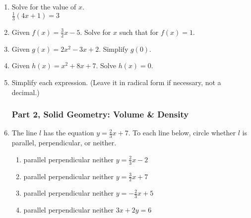 \documentclass[12pt, twoside]{article}
\begin{document}
\begin{enumerate}
\newpage
  \item   Solve for the value of $x$.\\[0.5cm]
  $\frac{1}{3}(4x+1)=3$ \vspace{3cm}

  \item Given $f(x)=\frac{3}{2} x-5$. Solve for $x$ such that for $f(x)=1$. \vspace{3.5cm}
  \item Given $g(x)=2x^2-3x+2$. Simplify $g(0)$. \vspace{4cm}
  \item Given $h(x)=x^2+8x+7$. Solve $h(x)=0$. \vspace{5cm}

  \item Simplify each expression. (Leave it in radical form if necessary, not a decimal.)
    \begin{enumerate}
    \end{enumerate}


\newpage
\subsubsection*{Part 2, Solid Geometry: Volume \& Density}

  \item The line $l$ has the equation $y=\frac{2}{3}x+7$. To each line below, circle whether $l$ is parallel, perpendicular, or neither.
    \begin{enumerate}
      \item parallel \quad perpendicular \quad neither \qquad $y=\frac{2}{3}x-2$
      \vspace{0.5cm}
      \item parallel \quad perpendicular \quad neither \qquad $y=\frac{3}{2}x+7$
      \vspace{0.5cm}
      \item parallel \quad perpendicular \quad neither \qquad $y=-\frac{2}{3}x+5$
      \vspace{0.5cm}
      \item parallel \quad perpendicular \quad neither \qquad $3x+2y=6$
      \vspace{3.5cm}
    \end{enumerate}


\end{enumerate}
\end{document}
